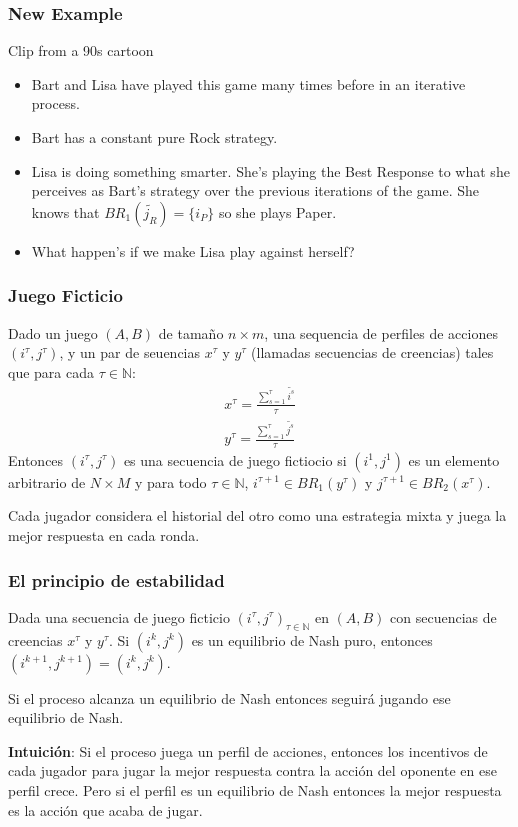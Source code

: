 \documentclass[pdf]{beamer}
\newcommand{\pstrat}{\widetilde}
\begin{document}
\begin{frame}
    \frametitle{New Example}
    Clip from a 90s cartoon
    \pause 
    \begin{itemize}
        \item \pause Bart and Lisa have played this game many times before in an iterative process.
        \item \pause Bart has a constant pure Rock strategy.
        \item \pause Lisa is doing something smarter. She's playing the Best Response to what she perceives as Bart's strategy over the previous iterations of the game. She knows that $BR_1(\pstrat{j_R}) = \{ i_P\}$ so she plays Paper. 
        \item \pause What happen's if we make Lisa play against herself?
    \end{itemize}
\end{frame}

\begin{frame}
    \frametitle{Juego Ficticio}

    \begin{definition} \label{def:fp:berger}
        Dado un juego $(A, B)$  de tamaño $n \times m$, una sequencia de perfiles de acciones $(i^\tau, j^\tau)$, y un par de seuencias $x^\tau$ y $y^\tau$ (llamadas secuencias de creencias) tales que para cada $\tau \in \mathbb{N}$:
        \begin{gather*}
            x^\tau= \frac{\sum^\tau_{s=1} \pstrat{i^s}}{\tau}  \\
            y^\tau= \frac{\sum^\tau_{s=1} \pstrat{j^s}}{\tau}
        \end{gather*}
        Entonces $(i^\tau, j^\tau)$ es una secuencia de juego fictiocio si $(i^1, j^1)$ es un elemento arbitrario de $N \times M$ y para todo $\tau \in \mathbb{N}$, $i^{\tau+1} \in BR_1(y^\tau)$ y $j^{\tau+1} \in BR_2(x^\tau)$.
    \end{definition}
    Cada jugador considera el historial del otro como una estrategia mixta y juega la mejor respuesta en cada ronda.
\end{frame}

\begin{frame}
    \frametitle{El principio de estabilidad}
    \begin{theorem}
        Dada una secuencia de juego ficticio $(i^\tau, j^\tau)_{\tau \in \mathbb{N}}$ en $(A, B)$ con secuencias de creencias $x^\tau$ y $y^\tau$. Si $(i^k, j^k)$ es un equilibrio de Nash puro, entonces $(i^{k+1}, j^{k+1}) = (i^k, j^k)$.
    \end{theorem}
    \pause Si el proceso alcanza un equilibrio de Nash entonces seguirá jugando ese equilibrio de Nash.

    \pause \textbf{Intuición}: Si el proceso juega un perfil de acciones, entonces los incentivos de cada jugador para jugar la mejor respuesta contra la acción del oponente en ese perfil crece. Pero si el perfil es un equilibrio de Nash entonces la mejor respuesta es la acción que acaba de jugar.
\end{frame}
\end{document}
